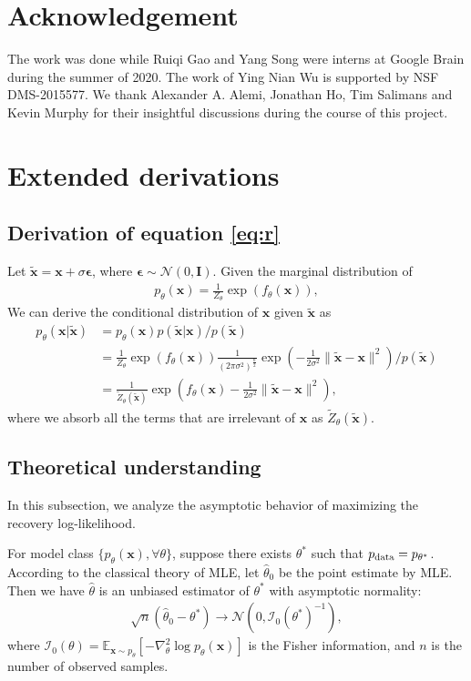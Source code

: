 \documentclass{article} \usepackage{iclr2021_conference,times}
\def\rvx{{\mathbf{x}}}
\def\mI{{\bm{I}}}
\newcommand{\pdata}{p_{\rm{data}}}
\newcommand{\E}{\mathbb{E}}
\def\N{{\mathcal N}}
\def\trvx{\tilde{\rvx}}
\def\beps{\bm{\epsilon}}
\begin{document}
\section*{Acknowledgement}
The work was done while Ruiqi Gao and Yang Song were interns at Google Brain during the summer of 2020. The work of Ying Nian Wu is supported by NSF DMS-2015577. We thank Alexander A. Alemi, Jonathan Ho, Tim Salimans and Kevin Murphy for their insightful discussions during the course of this project. 




\newpage 
\appendix
\section{Extended derivations}
\subsection{Derivation of equation \ref{eq:r}} \label{app:deri}
Let $\tilde{\rvx} = \rvx + \sigma \beps$, where $\beps \sim \N(0, \mI)$. Given the marginal distribution of 
\begin{eqnarray} 
     p_\theta(\rvx) = \frac{1}{Z_\theta}\exp(f_\theta(\rvx)), 
     \label{eqn:ebm-app}
\end{eqnarray}
We can derive the conditional distribution of $\rvx$ given $\trvx$ as
\begin{align}
    p_\theta(\rvx | \trvx) & = p_\theta(\rvx) p(\trvx | \rvx) / p(\trvx) \\
    & = \frac{1}{Z_\theta}\exp(f_\theta(\rvx)) \frac{1}{(2\pi\sigma^2)^{\frac{n}{2}}} \exp(- \frac{1}{2\sigma^2} \|\trvx-\rvx\|^2) / p(\trvx)\\
    & = \frac{1}{\tilde{Z}_\theta(\trvx)} \exp\left(f_\theta(\rvx) - \frac{1}{2\sigma^2} \|\trvx-\rvx\|^2\right),
\end{align}
where we absorb all the terms that are irrelevant of $\rvx$ as $\tilde{Z}_\theta(\trvx)$.

\subsection{Theoretical understanding} \label{app: theo}
In this subsection, we analyze the asymptotic behavior of maximizing the recovery log-likelihood.

For model class $\{p_\theta(\rvx), \forall \theta \}$, suppose there exists $\theta^*$ such that $\pdata = p_{\theta^*}$. According to the classical theory of MLE, let $\hat{\theta}_0$ be the point estimate by MLE. Then we have $\hat{\theta}$ is an unbiased estimator of $\theta^*$ with asymptotic normality: 
\begin{eqnarray} 
   \sqrt{n} (\hat{\theta}_0 - \theta^*) \to \N(0, \mathcal{I}_0(\theta^*)^{-1}), 
\end{eqnarray} 
where $\mathcal{I}_0(\theta) = \E_{\rvx \sim p_\theta} [ - \nabla^2_\theta \log p_\theta(\rvx) ]$  is the Fisher information, and $n$ is the number of observed samples.
\end{document}
